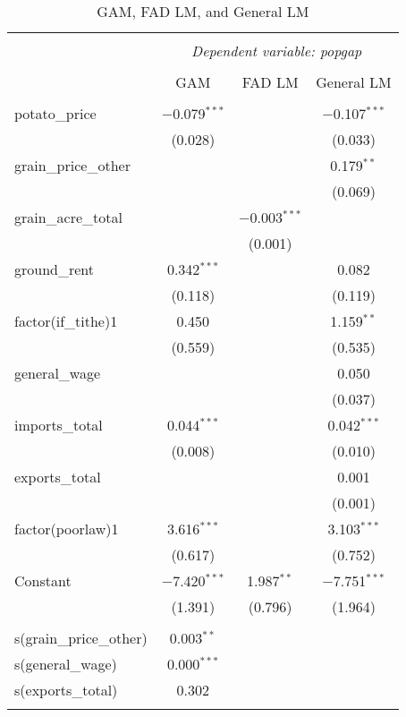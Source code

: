 \begin{table}[!htbp]
    \centering
    \caption{GAM, FAD LM, and General LM}
    \label{tab:combined_regression}
    \begin{tabular}{@{\extracolsep{5pt}}lccc}
    \\[-1.8ex]\hline
    \hline \\[-1.8ex]
    & \multicolumn{3}{c}{\textit{Dependent variable: popgap}} \\
    \cline{2-4}
    \\[-1.8ex] & GAM & FAD LM & General LM \\
    \hline \\[-1.8ex]
    potato\_price & $-$0.079$^{***}$ & & $-$0.107$^{***}$ \\
     & (0.028) & & (0.033) \\
    grain\_price\_other & &  & 0.179$^{**}$ \\
     & &  & (0.069) \\
    grain\_acre\_total & & $-$0.003$^{***}$ & \\
     & & (0.001) & \\
    ground\_rent & 0.342$^{***}$ & & 0.082 \\
     & (0.118) & & (0.119) \\
    factor(if\_tithe)1 & 0.450 & & 1.159$^{**}$ \\
     & (0.559) & & (0.535) \\
    general\_wage & & & 0.050 \\
     & & & (0.037) \\
    imports\_total & 0.044$^{***}$ & & 0.042$^{***}$ \\
     & (0.008) & & (0.010) \\
    exports\_total & & & 0.001 \\
     & & & (0.001) \\
    factor(poorlaw)1 & 3.616$^{***}$ & & 3.103$^{***}$ \\
     & (0.617) & & (0.752) \\
    Constant & $-$7.420$^{***}$ & 1.987$^{**}$ & $-$7.751$^{***}$ \\
     & (1.391) & (0.796) & (1.964) \\
    \hline \\[-1.8ex]
    s(grain\_price\_other) & 0.003$^{**}$ & & \\
    s(general\_wage) & 0.000$^{***}$ & & \\
    s(exports\_total) & 0.302 & & \\
    \hline \\[-1.8ex]

\end{tabular}
\end{table}
